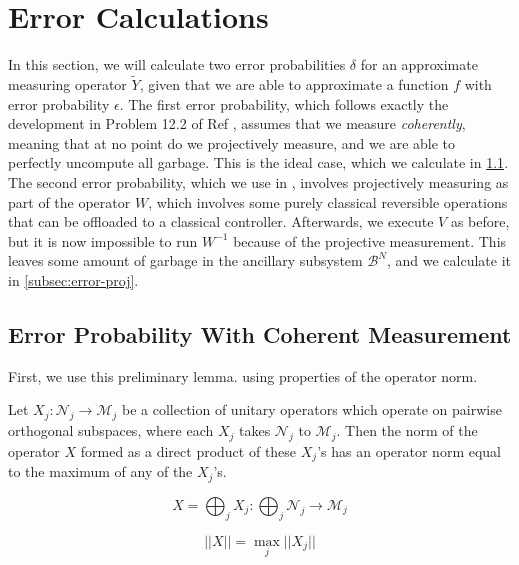 \section{Error Calculations}

In this section, we will calculate two error probabilities $\delta$ for
an approximate measuring operator $\tilde{Y}$, given that we are able to
approximate a function $f$ with error probability $\epsilon$. The first
error probability, which follows exactly the development in Problem 12.2
of Ref \cite{Kitaev2002}, assumes that we measure \emph{coherently}, meaning
that at no point do we projectively measure, and we are able to perfectly
uncompute all garbage. This is the ideal case, which we calculate in
\ref{subsec:error-noproj}. The second error probability, which we use in
\cite{Pham2012a}, involves projectively measuring as part of the operator $W$,
which involves some purely classical reversible operations that can be
offloaded to a classical controller. Afterwards, we execute $V$ as before,
but it is now impossible to run $W^{-1}$ because of the projective measurement.
This leaves some amount of garbage in the ancillary
subsystem $\mathcal{B}^N$, and we calculate it in \ref{subsec:error-proj}.

\subsection{Error Probability With Coherent Measurement}
\label{subsec:error-noproj}

First, we use this preliminary lemma. using properties of
the operator norm.

\begin{lemma}
\label{lemma:sum-norm}
Let $X_j : \mathcal{N}_j \rightarrow \mathcal{M}_j $
be a collection of unitary operators which operate on pairwise orthogonal
subspaces, where each $X_j$ takes $\mathcal{N}_j$ to $\mathcal{M}_j$.
Then the norm of the operator $X$ formed as a direct product of these
$X_j$'s has an operator norm equal to the maximum of any of the
$X_j$'s.

\begin{equation}
X = \bigoplus_j X_j : \bigoplus_j \mathcal{N}_j \rightarrow \mathcal{M}_j
\end{equation}

\begin{equation}
|| X || = \max_{j} ||X_j||
\end{equation}
\end{lemma}


